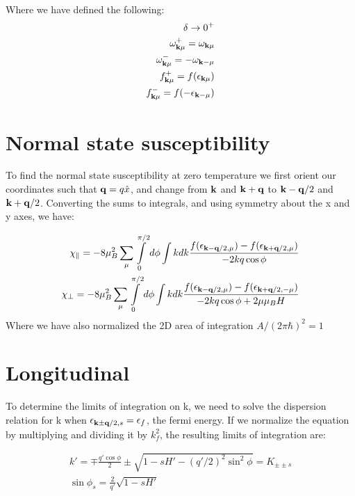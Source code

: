 \documentclass[prb,showpacs,amssymb,amsmath,twocolumn]{revtex4-1}
\begin{document}
\begin{widetext}
Where we have defined the following:
\begin{align*}
\delta \rightarrow 0^+ \\
\omega^+_{{\bf k}\mu} = \omega_{{\bf k}\mu} \\
\omega^-_{{\bf k}\mu} = -\omega_{{\bf k}-\mu} \\
f^+_{{\bf k}\mu} = f(\epsilon_{{\bf k}\mu}) \\
f^-_{{\bf k}\mu} = f(-\epsilon_{{\bf k}-\mu})
\end{align*}

\section{\label{sec:appB} Normal state susceptibility} 
%
To find the normal state susceptibility at zero temperature we first orient our coordinates such that ${\bf q}=q\hat{x}$, and change from ${\bf k}$ and ${\bf k+q}$ to ${\bf k-q}/2$ and ${\bf k+q}/2$. Converting the sums to integrals, and using symmetry about the x and y axes, we have:
 
 \begin{align*}
 \chi_\parallel=-8\mu_B^2\sum\limits_\mu \int\limits_0^{\pi/2} d\phi \int k dk  \frac{ f(\epsilon_{{\bf k-q}/2,\mu})-f(\epsilon_{{\bf k+q}/2,\mu})}{ -2kq\cos\phi} \\
  \chi_\perp=-8\mu_B^2\sum\limits_{\mu} \int\limits_0^{\pi/2} d\phi \int k dk  \frac{ f(\epsilon_{{\bf k-q}/2,\mu})-f(\epsilon_{{\bf k+q}/2,-\mu})}{ -2kq\cos\phi+2\mu \mu_B H}
 \end{align*}
 Where we have also normalized the 2D area of integration $A/(2\pi \hbar)^2=1$
 \section*{Longitudinal}
 To determine the limits of integration on k, we need to solve the dispersion relation for k when $\epsilon_{{\bf k\pm q}/2,s}=\epsilon_f$, the fermi energy. If we normalize the equation by multiplying and dividing it by $k_f^2$, the resulting limits of integration are:
 
 \begin{align*}
k'=\mp \frac{q'\cos\phi}{2} \pm\sqrt{1-sH'-(q'/2)^2\sin^2\phi} = K_{\pm\pm s} \\
\sin{\phi_s}=\frac{2}{q'}\sqrt{1-sH'} 
 \end{align*}
 

\end{widetext}
\end{document}
